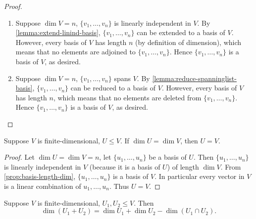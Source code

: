 \begin{proof} \
\begin{enumerate}[label=(\roman*)]
\item Suppose $\dim V=n$, $\{v_1,\dots,v_n\}$ is linearly independent in $V$. By \cref{lemma:extend-linind-basis}, $\{v_1,\dots,v_n\}$ can be extended to a basis of $V$. However, every basis of $V$ has length $n$ (by definition of dimension), which means that no elements are adjoined to $\{v_1,\dots,v_n\}$. Hence $\{v_1,\dots,v_n\}$ is a basis of $V$, as desired.

\item Suppose $\dim V=n$, $\{v_1,\dots,v_n\}$ spans $V$. By \cref{lemma:reduce-spanninglist-basis}, $\{v_1,\dots,v_n\}$ can be reduced to a basis of $V$. However, every basis of $V$ has length $n$, which means that no elements are deleted from $\{v_1,\dots,v_n\}$. Hence $\{v_1,\dots,v_n\}$ is a basis of $V$, as desired.
\end{enumerate}
\end{proof}

\begin{corollary}
Suppose $V$ is finite-dimensional, $U\le V$. If $\dim U=\dim V$, then $U=V$.
\end{corollary}

\begin{proof}
Let $\dim U=\dim V=n$, let $\{u_1,\dots,u_n\}$ be a basis of $U$. Then $\{u_1,\dots,u_n\}$ is linearly independent in $V$ (because it is a basis of $U$) of length $\dim V$. From \cref{prop:basis-length-dim}, $\{u_1,\dots,u_n\}$ is a basis of $V$. In particular every vector in $V$ is a linear combination of $u_1,\dots,u_n$. Thus $U=V$.
\end{proof}

\begin{lemma}
Suppose $V$ is finite-dimensional, $U_1,U_2\le V$. Then
\[\dim(U_1+U_2)=\dim U_1+\dim U_2-\dim(U_1\cap U_2).\]
\end{lemma}

